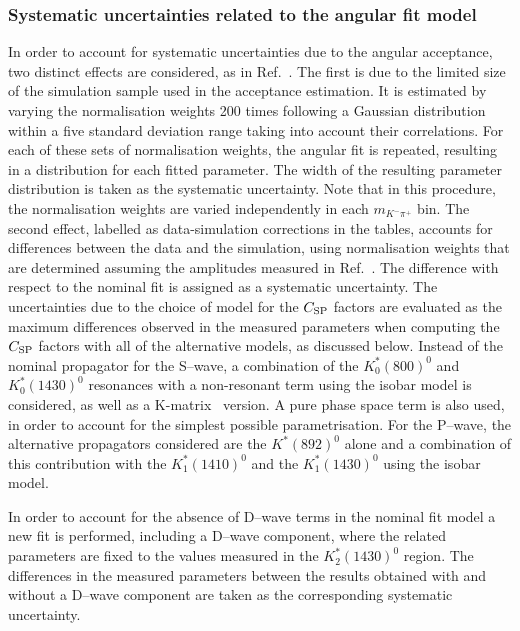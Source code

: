 \documentclass[12pt,a4paper]{article}
\newcommand{\mkpi}{\ensuremath{m_{\Km\pip}}\xspace}
\newcommand{\Km}{\ensuremath{K^-}\xspace}
\newcommand{\pip}{\ensuremath{\pi^+}\xspace}
\newcommand{\swave}{{\rm S--wave}\xspace}
\newcommand{\pwave}{{\rm P--wave}\xspace}
\newcommand{\dwave}{{\rm D--wave}\xspace}
\begin{document}
\subsubsection{Systematic uncertainties related to the angular fit model}

In order to account for systematic uncertainties due to the angular acceptance, two distinct effects are considered, as in Ref.~\cite{LHCb-PAPER-2014-059}.
The first is due to the limited size of the simulation sample used in the acceptance estimation. 
It is estimated by varying the normalisation weights 200 times following a Gaussian distribution within a five standard deviation range 
taking into account their correlations. For each of these sets of normalisation weights, the angular fit is repeated, resulting in a distribution for each fitted parameter. 
The width of the resulting parameter distribution is taken as the systematic uncertainty.
Note that in this procedure, the normalisation weights are varied independently in each \mkpi bin.
The second effect, labelled as data-simulation corrections in the tables, accounts for differences between the data and the simulation, using normalisation weights that are determined assuming the amplitudes measured in Ref.~\cite{LHCb-PAPER-2013-023}.  
The difference with respect to the nominal fit is assigned as a systematic uncertainty.
The uncertainties due to the choice of model for the $C_{\rm SP}$ factors are evaluated as the maximum differences observed in the measured parameters when computing the $C_{\rm SP}$ factors with all of the alternative models, as discussed below.
Instead of the nominal propagator for the \swave, a combination of the $K_{0}^{*}(800)^{0}$ and $K_{0}^{*}(1430)^{0}$ resonances with a non-resonant term using the isobar model is considered, as well as a K-matrix~\cite{Aitchison:1972ay} version. 
A pure phase space term is also used, in order to account for the simplest possible parametrisation.
For the \pwave, the alternative propagators considered are the $K^{*}(892)^{0}$ alone and a combination of this contribution with the $K_{1}^{*}(1410)^{0}$ and the $K_{1}^{*}(1430)^{0}$ using the isobar model.

In order to account for the absence of \dwave terms in the nominal fit model a new fit is performed, including a \dwave component, where the related parameters are fixed to the values measured in the $K^{*}_{2}(1430)^{0}$ region. 
The differences in the measured parameters between the results obtained with and without a \dwave component are taken as the corresponding systematic uncertainty.
\end{document}
